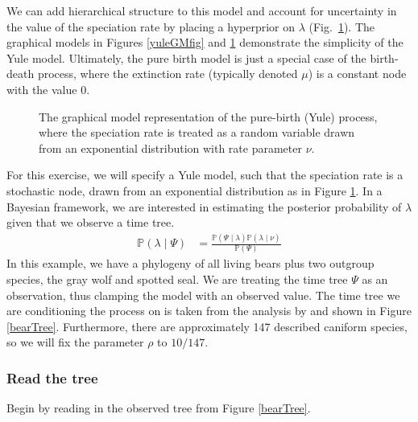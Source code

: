 We can add hierarchical structure to this model and account for uncertainty in the value of the speciation rate by placing a hyperprior on $\lambda$ (Fig.~\ref{yuleGMfig2}). The graphical models in Figures \ref{yuleGMfig} and \ref{yuleGMfig2} demonstrate the simplicity of the Yule model. 
Ultimately, the pure birth model is just a special case of the birth-death process, where the extinction rate (typically denoted $\mu$) is a constant node with the value 0. 
\begin{figure}[h!]
\centering
{}
\caption{\small The graphical model representation of the pure-birth (Yule) process, where the speciation rate is treated as a random variable drawn from an exponential distribution with rate parameter $\nu$.}
\label{yuleGMfig2}
\end{figure}

For this exercise, we will specify a Yule model, such that the speciation rate is a stochastic node, drawn from an exponential distribution as in Figure \ref{yuleGMfig2}.
In a Bayesian framework, we are interested in estimating the posterior probability of $\lambda$ given that we observe a time tree.
\begin{align}\label{bayesTher}
\mathbb{P}(\lambda \mid \Psi) &= \frac{\mathbb{P}(\Psi \mid \lambda)\mathbb{P}(\lambda \mid \nu)}{\mathbb{P}(\Psi)}
\end{align}
In this example, we have a phylogeny of all living bears plus two outgroup species, the gray wolf and spotted seal. 
We are treating the time tree $\Psi$ as an observation, thus clamping the model with an observed value.
The time tree we are conditioning the process on is taken from the analysis by \citet{dosReis2012} and shown in Figure \ref{bearTree}.
Furthermore, there are approximately 147 described caniform species, so we will fix the parameter $\rho$ to $10/147$.



\subsubsection{Read the tree}

Begin by reading in the observed tree from Figure \ref{bearTree}. 

